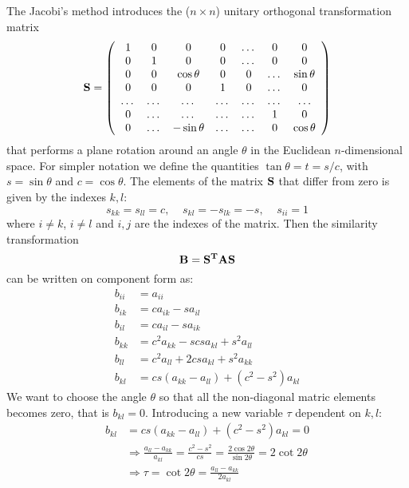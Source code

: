 \documentclass[11pt,a4wide]{article}
\begin{document}
The Jacobi's method introduces the ($n\times n$) unitary orthogonal transformation matrix 
\begin{equation}
    \bf S = \left( \begin{array}{ccccccc} 1 & 0 & 0   & 0    & \dots  &0     & 0 \\
                                0  & 1 & 0 & 0    & \dots  &0     &0 \\
                                0   & 0 & \cos \theta & 0  &0       &\dots & \sin \theta\\
                                0   & 0 & 0  & 1  &0       &\dots & 0\\
                                \dots  & \dots & \dots & \dots  &\dots      &\dots & \dots\\
                                0   & \dots & \dots & \dots  &\dots       &1 & 0\\
                                0   & \dots & -\sin \theta & \dots  &\dots       &0 & \cos \theta

             \end{array} \right) 
      \label{eq:sematrix}
\end{equation}
that performs a plane rotation around an angle $\theta$ in the Euclidean $n$-dimensional space. For simpler notation we define the quantities $\tan\theta = t= s/c$, with $s=\sin\theta$ and $c=\cos\theta$. The elements of the matrix $\bf S$ that differ from zero is given by the indexes $k,l$:
\[
s_{kk} = s_{ll} = c, \;\;\;\;  s_{kl} = -s_{lk} = -s,\;\; \;\;  s_{ii} = 1
\]
where $i\neq k$, $i\neq l$ and $i,j$ are the indexes of the matrix. Then the similarity transformation 
\[
\bf B = \bf {S^T AS}
\]
can be written on component form as:
\begin{align*}
b_{ii} &= a_{ii}\\
b_{ik} &= ca_{ik} - sa_{il} \\
b_{il} &= ca_{il} - sa_{ik} \\
b_{kk} &= c^2a_{kk} - s csa_{kl} + s^2 a_{ll} \\
b_{ll} &= c^2a_{ll} + 2csa_{kl} + s^2a_{kk} \\
b_{kl} &= cs(a_{kk} - a_{ll}) + (c^2 - s^2)a_{kl}
\end{align*}
We want to choose the angle $\theta$ so that all the non-diagonal matric elements becomes zero, that is $b_{kl} = 0$. Introducing a new variable $\tau$ dependent on $k,l$:
\begin{align*}
b_{kl} &= cs(a_{kk} - a_{ll}) + (c^2 - s^2)a_{kl} = 0\\
&\Rightarrow \frac{a_{ll}-a_{kk}}{a_{kl}} = \frac{c^2 - s^2}{cs} = \frac{2\cos{2\theta}}{\sin{2\theta}} = 2 \cot{2\theta}\\
&\Rightarrow \tau = \cot{2\theta} = \frac{a_{ll}-a_{kk}}{2a_{kl}}
\end{align*}
\end{document}

